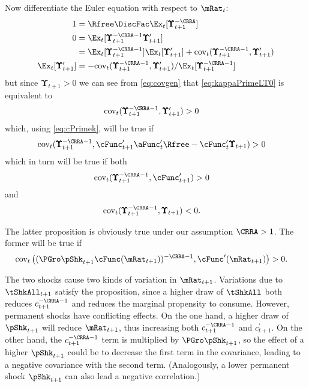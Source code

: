 \documentclass[BufferStockTheory]{subfiles}
\begin{document}
Now differentiate the Euler equation with respect to $\mRat_{t}$:
\begin{align}
  1  & = \Rfree \DiscFac \Ex_{t}[ \pmb{\Upsilon}_{t+1}^{-\CRRA}] \notag
  \\ 0  & = \Ex_{t}[\pmb{\Upsilon}_{t+1}^{-\CRRA-1} \pmb{\Upsilon}_{t+1}^{\prime}] \notag
  \\  & = \Ex_{t}[\pmb{\Upsilon}_{t+1}^{-\CRRA-1}]\Ex_{t}[\pmb{\Upsilon}_{t+1}^{\prime}]+\mbox{cov}_{t}(\pmb{\Upsilon}_{t+1}^{-\CRRA-1},\pmb{\Upsilon}_{t+1}^{\prime}) \notag
  \\ \Ex_{t}[\pmb{\Upsilon}_{t+1}^{\prime}]  & = -\mbox{cov}_{t}(\pmb{\Upsilon}_{t+1}^{-\CRRA-1},\pmb{\Upsilon}_{t+1}^{\prime})/\Ex_{t}[\pmb{\Upsilon}_{t+1}^{-\CRRA-1}] \label{eq:covgen}
\end{align}
but since $\pmb{\Upsilon}_{t+1} > 0$ we can see from \eqref{eq:covgen} that \eqref{eq:kappaPrimeLT0} is equivalent to
\begin{align}
  \mbox{cov}_{t}(\pmb{\Upsilon}_{t+1}^{-\CRRA-1},\pmb{\Upsilon}_{t+1}^{\prime})  & > 0 \nonumber
\end{align}
which, using \eqref{eq:cPrimek}, will be true if
\begin{align}
  \mbox{cov}_{t}(\pmb{\Upsilon}_{t+1}^{-\CRRA-1},\cFunc^{\prime}_{t+1}\aFunc^{\prime}_{t}\Rfree - \cFunc^{\prime}_{t}\pmb{\Upsilon}_{t+1})  & > 0 \notag
\end{align}
which in turn will be true if both
\begin{align}
  \mbox{cov}_{t}(\pmb{\Upsilon}_{t+1}^{-\CRRA-1},\cFunc^{\prime}_{t+1} )  & > 0 \notag
\end{align}
and
\begin{align*}
  \mbox{cov}_{t}(\pmb{\Upsilon}_{t+1}^{-\CRRA-1},\pmb{\Upsilon}_{t+1})  & < 0. \notag
\end{align*}

The latter proposition is obviously true under our assumption $\CRRA > 1$.  The former will be true if
\begin{align*}
  \mbox{cov}_{t}\left((\PGro \pShk_{t+1} \cFunc(\mRat_{t+1}))^{-\CRRA-1},\cFunc^{\prime}(\mRat_{t+1}) \right)  & > 0 \nonumber.
\end{align*}

The two shocks cause two kinds of variation in $\mRat_{t+1}$.
Variations due to $\tShkAll_{t+1}$ satisfy the proposition, since a
higher draw of $\tShkAll$ both reduces $c_{t+1}^{-\CRRA-1}$ and
reduces the marginal propensity to consume.  However, permanent shocks
have conflicting effects.  On the one hand, a higher draw of
$\pShk_{t+1}$ will reduce $\mRat_{t+1}$, thus increasing both
$c_{t+1}^{-\CRRA-1}$ and $c_{t+1}^{\prime}$.  On the other hand, the
$c_{t+1}^{-\CRRA-1}$ term is multiplied by $\PGro \pShk_{t+1}$, so the
effect of a higher $\pShk_{t+1}$ could be to decrease the first term
in the covariance, leading to a negative covariance with the second
term.  (Analogously, a lower permanent shock $\pShk_{t+1}$ can also
lead a negative correlation.)
\end{document}
